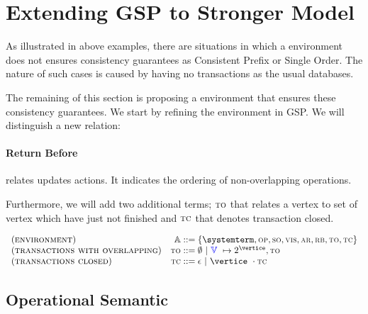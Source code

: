 
\section{Extending GSP to Stronger Model}
\label{sec:transactions}

As illustrated in above examples, there are situations in which a environment does not ensures consistency guarantees as Consistent Prefix or Single Order. The nature of such cases is caused by having no transactions as the usual databases.

The remaining of this section is proposing a environment that ensures these consistency guarantees. We start by refining the environment in GSP. We will distinguish a new relation:

\paragraph{Return Before} relates updates actions. It indicates the ordering of non-overlapping operations. 

Furthermore, we will add two additional terms; $\textsc{\scriptsize{TO}}$ that relates a vertex to set of vertex which have just not finished and $\textsc{\scriptsize{TC}}$ that denotes transaction closed.


\[
    \begin{array}{l@{\quad}r@{\;::=\;}l}
			 (\textsc{environment}) & \environmentterm &  \environmenttran{\systemterm}{\op}{\so}{\vis}{\arb}{\rb}{\tx}{\tc} \\
			 (\textsc{transactions with overlapping}) & \tx &  \emptyset  \ | \ \verticesets\ \mapsto 2^{\vertice},\tx   \\
			 (\textsc{transactions closed}) & \tc &  \epsilon  \ | \ \vertice\ \cdot \tc 
	   \end{array}
\]


\subsection{Operational Semantic}




